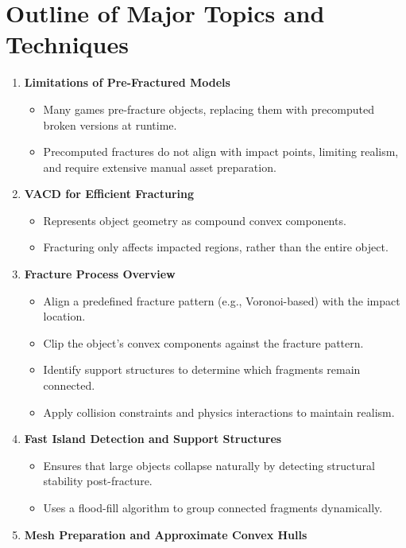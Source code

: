 \documentclass[12pt]{article}
\begin{document}
\section{Outline of Major Topics and Techniques}
\begin{enumerate}[noitemsep]
    \item \textbf{Limitations of Pre-Fractured Models}
    \begin{itemize}[noitemsep]
        \item Many games pre-fracture objects, replacing them with precomputed broken versions at runtime.
        \item Precomputed fractures do not align with impact points, limiting realism, and require extensive manual asset preparation.
    \end{itemize}
    \item \textbf{VACD for Efficient Fracturing}
    \begin{itemize}[noitemsep]
        \item Represents object geometry as compound convex components.
        \item Fracturing only affects impacted regions, rather than the entire object.
    \end{itemize}
    \item \textbf{Fracture Process Overview}
    \begin{itemize}[noitemsep]
        \item Align a predefined fracture pattern (e.g., Voronoi-based) with the impact location.
        \item Clip the object's convex components against the fracture pattern.
        \item Identify support structures to determine which fragments remain connected.
        \item Apply collision constraints and physics interactions to maintain realism.
    \end{itemize}
    \item \textbf{Fast Island Detection and Support Structures}
    \begin{itemize}[noitemsep]
        \item Ensures that large objects collapse naturally by detecting structural stability post-fracture.
        \item Uses a flood-fill algorithm to group connected fragments dynamically.
    \end{itemize}
    \item \textbf{Mesh Preparation and Approximate Convex Hulls}

\end{enumerate}
\end{document}

